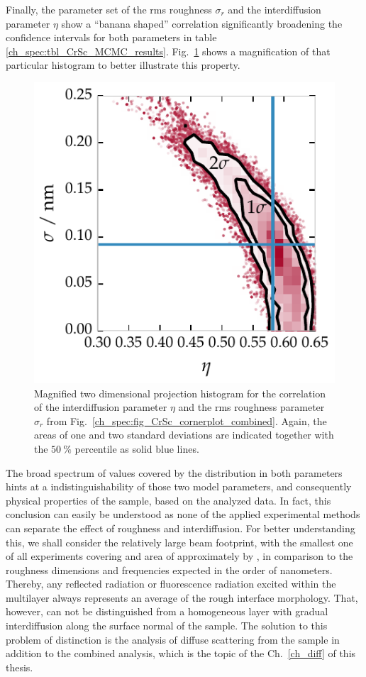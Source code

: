 Finally, the parameter set of the \gls{rms} roughness $\sigma_r$ and the interdiffusion parameter $\eta$ show a ``banana shaped'' correlation significantly broadening the confidence intervals for both parameters in table \ref{ch_spec:tbl_CrSc_MCMC_results}. Fig.~\ref{ch_spec:fig_CrSc_eta_rho_correlation} shows a magnification of that particular histogram to better illustrate this property.
\begin{figure}[htbp]
  \centering
  \includegraphics{img/CrSc_eta_rho_correlation}
  \caption[Correlation of the roughness and intermixing parameter in the Cr/Sc sample.]{Magnified two dimensional projection histogram for the correlation of the interdiffusion parameter $\eta$ and the \gls{rms} roughness parameter $\sigma_r$ from Fig.~\ref{ch_spec:fig_CrSc_cornerplot_combined}. Again, the areas of one and two standard deviations are indicated together with the $\SI{50}{\percent}$ percentile as solid blue lines.}
  \label{ch_spec:fig_CrSc_eta_rho_correlation}
\end{figure}
The broad spectrum of values covered by the distribution in both parameters hints at a indistinguishability of those two model parameters, and consequently physical properties of the sample, based on the analyzed data. In fact, this conclusion can easily be understood as none of the applied experimental methods can separate the effect of roughness and interdiffusion. For better understanding this, we shall consider the relatively large beam footprint, with the smallest one of all experiments covering and area of approximately  by , in comparison to the roughness dimensions and frequencies expected in the order of nanometers. Thereby, any reflected radiation or fluorescence radiation excited within the multilayer always represents an average of the rough interface morphology. That, however, can not be distinguished from a homogeneous layer with gradual interdiffusion along the surface normal of the sample. The solution to this problem of distinction is the analysis of diffuse scattering from the sample in addition to the combined analysis, which is the topic of the Ch.~\ref{ch_diff} of this thesis.

